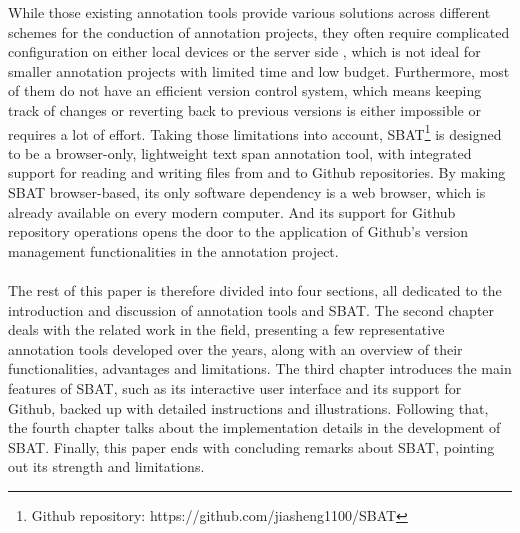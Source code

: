 \documentclass[12ptm a4paper]{article}
\begin{document}
While those existing annotation tools provide various solutions across different schemes for the conduction of annotation projects, they often require complicated configuration on either local devices or the server side \citep{yang2018yeddalightweightcollaborativetext}, which is not ideal for smaller annotation projects with limited time and low budget. Furthermore, most of them do not have an efficient version control system, which means keeping track of changes or reverting back to previous versions is either impossible or requires a lot of effort. Taking those limitations into account, SBAT\footnote{Github repository: https://github.com/jiasheng1100/SBAT} is designed to be a browser-only, lightweight text span annotation tool, with integrated support for reading and writing files from and to Github repositories. By making SBAT browser-based, its only software dependency is a web browser, which is already available on every modern computer. And its support for Github repository operations opens the door to the application of Github's version management functionalities in the annotation project.\\
\\
The rest of this paper is therefore divided into four sections, all dedicated to the introduction and discussion of annotation tools and SBAT. The second chapter deals with the related work in the field, presenting a few representative annotation tools developed over the years, along with an overview of their functionalities, advantages and limitations. The third chapter introduces the main features of SBAT, such as its interactive user interface and its support for Github, backed up with detailed instructions and illustrations. Following that, the fourth chapter talks about the implementation details in the development of SBAT. Finally, this paper ends with concluding remarks about SBAT, pointing out its strength and limitations.


\newpage
\end{document}
